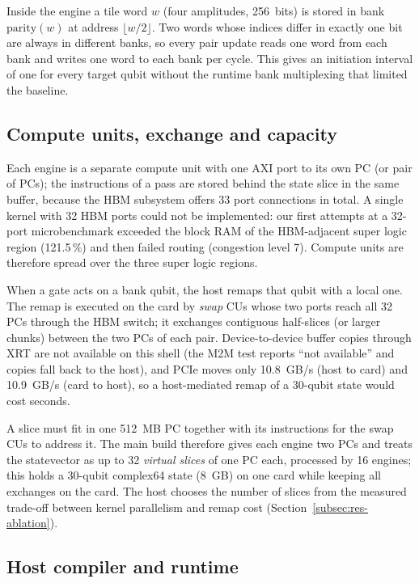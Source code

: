 \documentclass[pdflatex,sn-mathphys-num]{sn-jnl}
\newcommand{\NumHbmCongestion}{7}
\newcommand{\NumHbmFirstBramPct}{121.5}
\newcommand{\NumHbmPortConnections}{33}
\newcommand{\NumPcieDtoH}{10.9}
\newcommand{\NumPcieHtoD}{10.8}
\theoremstyle{thmstyleone}
\theoremstyle{thmstylethree}
\begin{document}
Inside the engine a tile word $w$ (four amplitudes, 256~bits) is stored in bank $\mathrm{parity}(w)$ at address $\lfloor w/2\rfloor$. Two words whose indices differ in exactly one bit are always in different banks, so every pair update reads one word from each bank and writes one word to each bank per cycle. This gives an initiation interval of one for every target qubit without the runtime bank multiplexing that limited the baseline.

\subsection{Compute units, exchange and capacity}\label{subsec:cus}

Each engine is a separate compute unit with one AXI port to its own PC (or pair of PCs); the instructions of a pass are stored behind the state slice in the same buffer, because the HBM subsystem offers \NumHbmPortConnections{} port connections in total. A single kernel with 32 HBM ports could not be implemented: our first attempts at a 32-port microbenchmark exceeded the block RAM of the HBM-adjacent super logic region (\NumHbmFirstBramPct\,\%) and then failed routing (congestion level \NumHbmCongestion). Compute units are therefore spread over the three super logic regions.

When a gate acts on a bank qubit, the host remaps that qubit with a local one. The remap is executed on the card by \emph{swap} CUs whose two ports reach all 32 PCs through the HBM switch; it exchanges contiguous half-slices (or larger chunks) between the two PCs of each pair. Device-to-device buffer copies through XRT are not available on this shell (the M2M test reports ``not available'' and copies fall back to the host), and PCIe moves only \NumPcieHtoD~GB/s (host to card) and \NumPcieDtoH~GB/s (card to host), so a host-mediated remap of a 30-qubit state would cost seconds.

A slice must fit in one 512~MB PC together with its instructions for the swap CUs to address it. The main build therefore gives each engine two PCs and treats the statevector as up to 32 \emph{virtual slices} of one PC each, processed by 16 engines; this holds a 30-qubit complex64 state (8~GB) on one card while keeping all exchanges on the card. The host chooses the number of slices from the measured trade-off between kernel parallelism and remap cost (Section~\ref{subsec:res-ablation}).

\subsection{Host compiler and runtime}\label{subsec:host}
\end{document}
